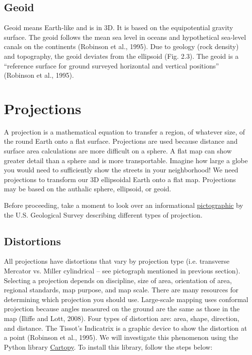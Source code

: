 \documentclass[a4paper , 12pt]{book}
\begin{document}
\subsection{Geoid}

Geoid means Earth-like and is in 3D. It is based on the equipotential gravity surface. The geoid follows the mean sea level in oceans and hypothetical sea-level canals on the continents (Robinson et al., 1995). Due to geology (rock density) and topography, the geoid deviates from the ellipsoid (Fig. 2.3). The geoid is a “reference surface for ground surveyed horizontal and vertical positions” (Robinson et al., 1995).

\section{Projections} \label{projections}

A projection is a mathematical equation to transfer a region, of whatever size, of the round Earth onto a flat surface. Projections are used because distance and surface area calculations are more difficult on a sphere. A flat map can show greater detail than a sphere and is more transportable. Imagine how large a globe you would need to sufficiently show the streets in your neighborhood! We need projections to transform our 3D ellipsoidal Earth onto a flat map. Projections may be based on the authalic sphere, ellipsoid, or geoid.

Before proceeding, take a moment to look over an informational \href{https://pubs.usgs.gov/gip/70047422/report.pdf}{pictographic} by the U.S. Geological Survey describing different types of projection.

\subsection{Distortions}

All projections have distortions that vary by projection type (i.e. transverse Mercator vs. Miller cylindrical – see pictograph mentioned in previous section). Selecting a projection depends on discipline, size of area, orientation of area, regional standards, map purpose, and map scale. There are many resources for determining which projection you should use. Large-scale mapping uses conformal projection because angles measured on the ground are the same as those in the map (Iliffe and Lott, 2008). Four types of distortion are: area, shape, direction, and distance. The Tissot’s Indicatrix is a graphic device to show the distortion at a point (Robinson et al., 1995). We will investigate this phenomenon using the Python library \href{https://scitools.org.uk/cartopy/docs/latest/#}{Cartopy}. To install this library, follow the steps below:
\end{document}
